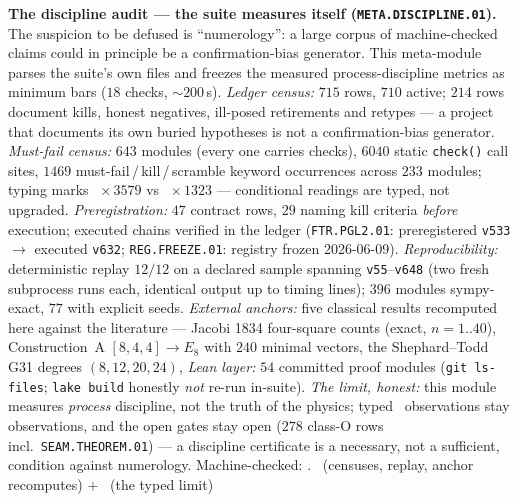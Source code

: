 \par\smallskip\noindent\textbf{The discipline audit --- the suite measures
itself (\texttt{META.DISCIPLINE.01}).}
The suspicion to be defused is ``numerology'': a large corpus of
machine-checked claims could in principle be a confirmation-bias
generator.  This meta-module parses the suite's own files and freezes
the measured process-discipline metrics as minimum bars ($18$ checks,
${\sim}200$\,s).  \emph{Ledger census:} $715$ rows, $710$ active;
$214$ rows document kills, honest negatives, ill-posed retirements and
retypes --- a project that documents its own buried hypotheses is not a
confirmation-bias generator.  \emph{Must-fail census:} $643$ modules
(every one carries checks), $6040$ static \texttt{check()} call sites,
$1469$ must-fail\,/\,kill\,/\,scramble keyword occurrences across
$233$ modules; typing marks \mE~$\times\,3579$ vs \mC~$\times\,1323$
--- conditional readings are typed, not upgraded.
\emph{Preregistration:} $47$ contract rows, $29$ naming kill criteria
\emph{before} execution; executed chains verified in the ledger
(\texttt{FTR.PGL2.01}: preregistered \texttt{v533} $\to$ executed
\texttt{v632}; \texttt{REG.FREEZE.01}: registry
frozen 2026-06-09).  \emph{Reproducibility:} deterministic replay
$12/12$ on a declared sample spanning \texttt{v55}--\texttt{v648}
(two fresh subprocess runs each, identical output up to timing lines);
$396$ modules sympy-exact, $77$ with explicit seeds.  \emph{External
anchors:} five classical results recomputed here against the
literature --- Jacobi 1834 four-square counts (exact, $n=1..40$),
Construction~A $[8,4,4]\to E_8$ with $240$ minimal vectors, the
Shephard--Todd G31 degrees $(8,12,20,24)$,   \emph{Lean layer:} $54$ committed proof modules
(\texttt{git ls-files}; \texttt{lake build} honestly \emph{not} re-run
in-suite).  \emph{The limit, honest:} this module measures
\emph{process} discipline, not the truth of the physics; typed \mC\
observations stay observations, and the open gates stay open ($278$
class-O rows incl.\ \texttt{SEAM.THEOREM.01}) --- a discipline certificate is
a necessary, not a sufficient, condition against numerology.
Machine-checked: .
\mE\ (censuses, replay, anchor recomputes) $+$ \mC\ (the typed limit)
\par\smallskip

